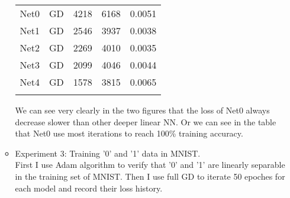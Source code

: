 \begin{enumerate}
\begin{itemize}
\begin{table}[H]
\begin{tabular}{lllll}
				Net0 & GD & 4218 & 6168 & 0.0051  \\
				
				Net1 & GD & 2546 & 3937 & 0.0038  \\
				
				Net2 & GD & 2269 & 4010 & 0.0035  \\
				
				Net3 & GD & 2099 & 4046 & 0.0044  \\
				
				Net4 & GD & 1578 & 3815 &0.0065  \\
				
				\noalign{\smallskip}\hline
				
			\end{tabular}
		\end{table}
		
		
		We can see very clearly in the two figures that the loss of Net0 always decrease slower than other deeper linear NN. Or we can see in the table that Net0 use most iterations to reach 100\% training accuracy. 
	
	    \item Experiment 3: Training '0' and '1' data in MNIST.\\
	     First I use Adam algorithm to verify that '0' and '1' are linearly separable in the training set of MNIST. Then I use full GD to iterate 50 epoches for each model and record their loss history. 
		\end{itemize}
	\end{enumerate}
